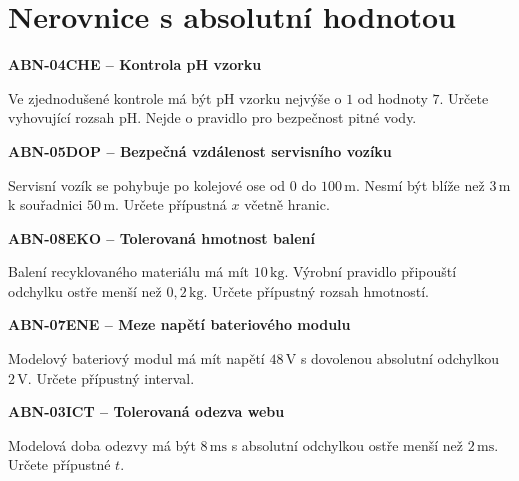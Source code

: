 \documentclass[11pt,a4paper]{article}
\begin{document}
\vspace{4mm}\par\noindent\dotfill\par\medskip

\section{Nerovnice s absolutní hodnotou}
\par\medskip\noindent\textbf{ABN-04}\quad\textbf{CHE -- Kontrola pH vzorku}\par
Ve zjednodušené kontrole má být pH vzorku nejvýše o $1$ od hodnoty $7$. Určete vyhovující rozsah pH. Nejde o pravidlo pro bezpečnost pitné vody.

\vspace{4mm}\par\noindent\dotfill\par\medskip
\par\medskip\noindent\textbf{ABN-05}\quad\textbf{DOP -- Bezpečná vzdálenost servisního vozíku}\par
Servisní vozík se pohybuje po kolejové ose od $0$ do $100\,\mathrm m$. Nesmí být blíže než $3\,\mathrm m$ k souřadnici $50\,\mathrm m$. Určete přípustná $x$ včetně hranic.

\vspace{4mm}\par\noindent\dotfill\par\medskip
\par\medskip\noindent\textbf{ABN-08}\quad\textbf{EKO -- Tolerovaná hmotnost balení}\par
Balení recyklovaného materiálu má mít $10\,\mathrm{kg}$. Výrobní pravidlo připouští odchylku ostře menší než $0{,}2\,\mathrm{kg}$. Určete přípustný rozsah hmotností.

\vspace{4mm}\par\noindent\dotfill\par\medskip
\par\medskip\noindent\textbf{ABN-07}\quad\textbf{ENE -- Meze napětí bateriového modulu}\par
Modelový bateriový modul má mít napětí $48\,\mathrm V$ s dovolenou absolutní odchylkou $2\,\mathrm V$. Určete přípustný interval.

\vspace{4mm}\par\noindent\dotfill\par\medskip
\par\medskip\noindent\textbf{ABN-03}\quad\textbf{ICT -- Tolerovaná odezva webu}\par
Modelová doba odezvy má být $8\,\mathrm{ms}$ s absolutní odchylkou ostře menší než $2\,\mathrm{ms}$. Určete přípustné $t$.
\end{document}
